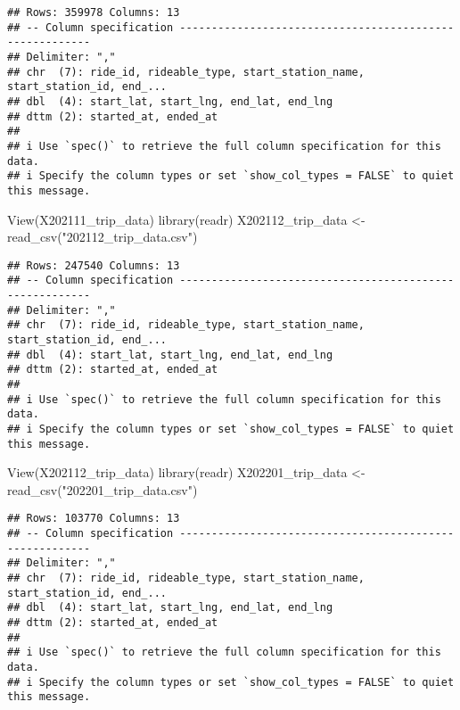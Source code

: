 \documentclass[
]{article}
\newenvironment{Shaded}{\begin{snugshade}}{\end{snugshade}}
\newcommand{\FunctionTok}[1]{\textcolor[rgb]{0.00,0.00,0.00}{#1}}
\newcommand{\NormalTok}[1]{#1}
\newcommand{\OtherTok}[1]{\textcolor[rgb]{0.56,0.35,0.01}{#1}}
\newcommand{\StringTok}[1]{\textcolor[rgb]{0.31,0.60,0.02}{#1}}
\begin{document}
\begin{verbatim}
## Rows: 359978 Columns: 13
## -- Column specification --------------------------------------------------------
## Delimiter: ","
## chr  (7): ride_id, rideable_type, start_station_name, start_station_id, end_...
## dbl  (4): start_lat, start_lng, end_lat, end_lng
## dttm (2): started_at, ended_at
## 
## i Use `spec()` to retrieve the full column specification for this data.
## i Specify the column types or set `show_col_types = FALSE` to quiet this message.
\end{verbatim}

\begin{Shaded}
\begin{Highlighting}[]
\FunctionTok{View}\NormalTok{(X202111\_trip\_data)}
\FunctionTok{library}\NormalTok{(readr)}
\NormalTok{X202112\_trip\_data }\OtherTok{\textless{}{-}} \FunctionTok{read\_csv}\NormalTok{(}\StringTok{"202112\_trip\_data.csv"}\NormalTok{)}
\end{Highlighting}
\end{Shaded}

\begin{verbatim}
## Rows: 247540 Columns: 13
## -- Column specification --------------------------------------------------------
## Delimiter: ","
## chr  (7): ride_id, rideable_type, start_station_name, start_station_id, end_...
## dbl  (4): start_lat, start_lng, end_lat, end_lng
## dttm (2): started_at, ended_at
## 
## i Use `spec()` to retrieve the full column specification for this data.
## i Specify the column types or set `show_col_types = FALSE` to quiet this message.
\end{verbatim}

\begin{Shaded}
\begin{Highlighting}[]
\FunctionTok{View}\NormalTok{(X202112\_trip\_data)}
\FunctionTok{library}\NormalTok{(readr)}
\NormalTok{X202201\_trip\_data }\OtherTok{\textless{}{-}} \FunctionTok{read\_csv}\NormalTok{(}\StringTok{"202201\_trip\_data.csv"}\NormalTok{)}
\end{Highlighting}
\end{Shaded}

\begin{verbatim}
## Rows: 103770 Columns: 13
## -- Column specification --------------------------------------------------------
## Delimiter: ","
## chr  (7): ride_id, rideable_type, start_station_name, start_station_id, end_...
## dbl  (4): start_lat, start_lng, end_lat, end_lng
## dttm (2): started_at, ended_at
## 
## i Use `spec()` to retrieve the full column specification for this data.
## i Specify the column types or set `show_col_types = FALSE` to quiet this message.
\end{verbatim}
\end{document}
